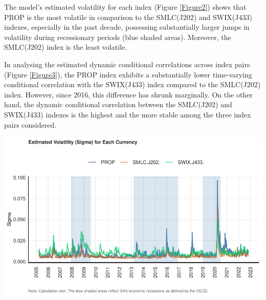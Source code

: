 \documentclass[11pt,preprint, authoryear]{elsarticle}
\let\origfigure\figure
\let\endorigfigure\endfigure
\renewenvironment{figure}[1][2] {
    \expandafter\origfigure\expandafter[H]
} {
    \endorigfigure
}
\numberwithin{equation}{section}
\numberwithin{figure}{section}
\numberwithin{table}{section}
\begin{document}
The model's estimated volatility for each index (Figure \ref{Figure2})
shows that PROP is the most volatile in comparison to the SMLC(J202) and
SWIX(J433) indexes, especially in the past decade, possessing
substantially larger jumps in volatility during recessionary periods
(blue shaded areas). Moreover, the SMLC(J202) index is the least
volatile.

In analysing the estimated dynamic conditional correlations across index
pairs (Figure \ref{Figure3}), the PROP index exhibits a substantially
lower time-varying conditional correlation with the SWIX(J433) index
compared to the SMLC(J202) index. However, since 2016, this difference
has shrunk marginally. On the other hand, the dynamic conditional
correlation between the SMLC(J202) and SWIX(J433) indexes is the highest
and the more stable among the three index pairs considered.

\begin{figure}[H]

{\centering \includegraphics{19025831_files/figure-latex/Figure2-1} 

}

\caption{DCC GARCH: Estimated Volatility \label{Figure2}}\label{fig:Figure2}
\end{figure}
\end{document}
